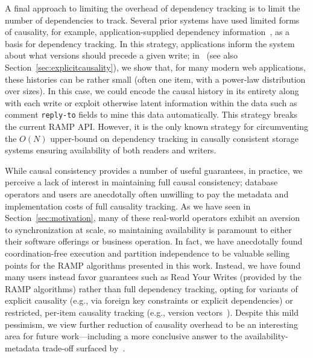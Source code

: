  A final approach to limiting the overhead of dependency tracking is to limit the number of dependencies to track. Several prior systems have used limited forms of causality, for example, application-supplied dependency information~\cite{bolton,lazyreplication}, as a basis for dependency tracking. In this strategy, applications inform the system about what versions should precede a given write; in~\cite{explicit-socc} (see also Section~\ref{sec:explicitcausality}), we show that, for many modern web applications, these histories can be rather small (often one item, with a power-law distribution over sizes). In this case, we could encode the causal history in its entirety along with each write or exploit otherwise latent information within the data such as comment \texttt{reply-to} fields to mine this data automatically. This strategy breaks the current RAMP API. However, it is the only known strategy for circumventing the $O(N)$ upper-bound on dependency tracking in causally consistent storage systems ensuring availability of both readers and writers.

 While causal consistency provides a number of useful guarantees, in practice, we perceive a lack of interest in maintaining full causal consistency; database operators and users are anecdotally often unwilling to pay the metadata and implementation costs of full causality tracking. As we have seen in Section~\ref{sec:motivation}, many of these real-world operators exhibit an aversion to synchronization at scale, so maintaining availability is paramount to either their software offerings or business operation. In fact, we have anecdotally found coordination-free execution and partition independence to be valuable selling points for the RAMP algorithms presented in this work. Instead, we have found many users instead favor guarantees such as Read Your Writes (provided by the RAMP algorithms) rather than full dependency tracking, opting for variants of explicit causality (e.g., via foreign key constraints or explicit dependencies) or restricted, per-item causality tracking (e.g., version vectors~\cite{dynamo}). Despite this mild pessimism, we view further reduction of causality overhead to be an interesting area for future work---including a more conclusive answer to the availability-metadata trade-off surfaced by~\cite{vc-lowerbound}.


\FloatBarrier

